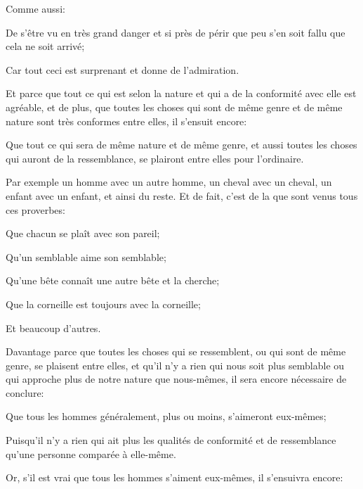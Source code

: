 Comme aussi:

\begin{lieu}
	De s'être vu en très grand danger et si près de périr que peu s'en soit fallu que cela ne soit arrivé;
\end{lieu}

Car tout ceci est surprenant et donne de l'admiration.

\bigbreak

Et parce que tout ce qui est selon la nature et qui a de la conformité avec elle est agréable, et de plus, que
toutes les choses qui sont de même genre et de même nature sont très conformes entre elles, il s'ensuit encore:

\begin{lieu}
	Que tout ce qui sera de même nature et de même genre, et aussi toutes les choses qui auront de la ressemblance,
	se plairont entre elles pour l'ordinaire. 
\end{lieu}

Par exemple un homme avec un autre homme, un cheval avec un cheval, un enfant avec un enfant, et ainsi du reste.
Et de fait, c'est de la que sont venus tous ces proverbes:

\begin{emphpar}
	Que chacun se plaît avec son pareil;

	Qu'un semblable aime son semblable;

	Qu'une bête connaît une autre bête et la cherche;

	Que la corneille est toujours avec la corneille;
\end{emphpar}

Et beaucoup d'autres.

\bigbreak

Davantage parce que toutes les choses qui se ressemblent, ou qui sont de même genre, se plaisent entre elles,
et qu'il n'y a rien qui nous soit plus semblable ou qui approche plus de notre nature que nous-mêmes, il sera
encore nécessaire de conclure:

\begin{lieu}
	Que tous les hommes généralement, plus ou moins, s'aimeront eux-mêmes;
\end{lieu}

Puisqu'il n'y a rien qui ait plus les qualités de conformité et de ressemblance qu'une personne comparée à
elle-même.

\bigbreak

Or, s'il est vrai que tous les hommes s'aiment eux-mêmes, il s'ensuivra encore:

